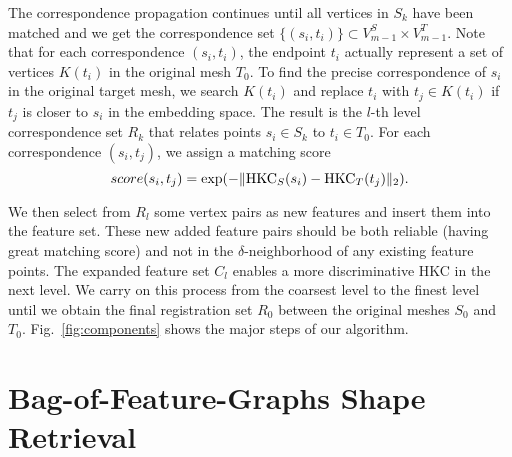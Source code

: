 The correspondence propagation continues until all vertices in $S_k$ have been matched and we get the correspondence set $\{(s_i,t_i)\} \subset V^S_{m-1} \times V^T_{m-1}$. Note that for each correspondence $(s_i,t_i)$, the endpoint $t_i$ actually represent a set of vertices $K(t_i)$ in the original mesh $T_0$. To find the precise correspondence of $s_i$ in the original target mesh, we search $K(t_i)$ and replace $t_i$ with $t_j \in K(t_i)$ if $t_j$ is closer to $s_i$ in the embedding space. The result is the $l$-th level correspondence set $R_k$ that relates points $s_i \in S_k$ to $t_i \in T_0$. For each correspondence $(s_i,t_j)$, we assign a matching score
\begin{equation}
score(s_i,t_j)=\exp(-\|{\operatorname*{HKC}}_S(s_i)-{\operatorname*{HKC}}_T(t_j)\|_2).
\end{equation}

We then select from $R_l$ some vertex pairs as new features and insert them into the feature set. These new added feature pairs should be both reliable (having great matching score) and not in the $\delta$-neighborhood of any existing feature points. The expanded feature set $C_l$ enables a more discriminative HKC in the next level. We carry on this process from the coarsest level to the finest level until we obtain the final registration set $R_0$ between the original meshes $S_0$ and $T_0$.
Fig.~\ref{fig:components} shows the major steps of our algorithm.


\section{Bag-of-Feature-Graphs Shape Retrieval}




